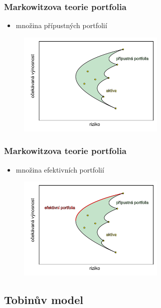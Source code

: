 \documentclass[xcolor=dvipsnames]{beamer}
\theoremstyle{definition} \newtheorem{definice}[veta]{Definice}
\theoremstyle{remark}
\begin{document}
\begin{frame}                     
  \frametitle{Markowitzova teorie portfolia}
  \begin{itemize}
   \item množina přípustných portfolií 
  \end{itemize}

  \begin{figure}[!htbp]
  \centering 
  \includegraphics[width=7cm]{IMG/graf_3a.pdf}
 \end{figure}
\end{frame}

\begin{frame}
  \frametitle{Markowitzova teorie portfolia}
  \begin{itemize}
   \item množina efektivních portfolií 
  \end{itemize}
  
  \begin{figure}[!htbp]
  \centering 
  \includegraphics[width=7cm]{IMG/graf_2a.pdf}
 \end{figure}
\end{frame}

\subsection{Tobinův model}
\end{document}
